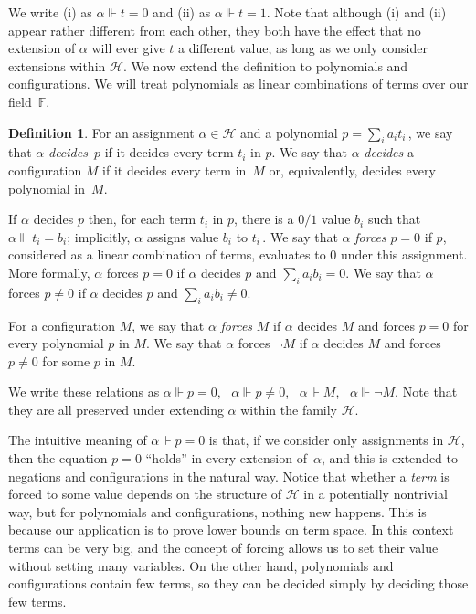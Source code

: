 \documentclass[11pt]{article}
\numberwithin{equation}{section}
\theoremstyle{definition}
\newtheorem{definition}[theorem]{Definition}
\theoremstyle{plain}
\newcommand\calH{\mathcal{H}}
\newcommand\bbF{\mathbb{F}}
\begin{document}
We write (i) as $\alpha \Vdash t=0$ and (ii) as $\alpha \Vdash t=1$.
Note that although (i) and  (ii) appear rather different from each other, they both have
the effect that no extension of $\alpha$ will ever give $t$ a different value,
as long as we only consider extensions within $\calH$.
We now extend the definition to polynomials and configurations.
We will treat polynomials as  linear combinations of terms over our field~$\bbF$.

\begin{definition}\label{def:forcing}
For an assignment $\alpha \in \calH$ and a polynomial $p=\sum_{i}a_i t_i$\,,
we say that $\alpha$ \emph{decides}~$p$ if it decides every term $t_i$ in $p$.
We say that $\alpha$ \emph{decides} a configuration $M$ if it decides every term in~$M$
or, equivalently, decides every polynomial in~$M$.

If $\alpha$ decides $p$ then, for each term $t_i$ in $p$, there is a $0/1$ value
$b_i$ such that $\alpha \Vdash t_i=b_i$; implicitly, $\alpha$ assigns value $b_i$ to $t_i$\,. 
We say that $\alpha$ \emph{forces} $p=0$ 
if $p$, considered as a linear combination of terms, evaluates to $0$ under this assignment.
More formally, $\alpha$ forces $p=0$ if $\alpha$ decides $p$ and $\sum_{i} a_ib_i =0$.
We say that $\alpha$ forces $p \neq 0$ if $\alpha$ decides $p$ and $\sum_{i} a_ib_i \neq 0$.

For a configuration $M$, we say that $\alpha$ \emph{forces} $M$ if $\alpha$ decides
$M$ and forces $p=0$ for every polynomial $p$ in $M$. We say that 
$\alpha$ forces $\neg M$ if $\alpha$ decides $M$ and forces $p \neq 0$ for some $p$ in $M$.
\end{definition}

We write these relations as $\alpha \Vdash p=0$, \ $\alpha \Vdash p \neq 0$, \
$\alpha \Vdash M$, \ $\alpha \Vdash \neg M$.
 Note that 
they are all preserved under extending $\alpha$ within the family $\calH$.

The intuitive meaning of $\alpha \Vdash p=0$ is that, if we consider only assignments in $\calH$,
then the equation $p=0$ ``holds'' in every extension of~$\alpha$, and this 
is extended to negations and configurations in the natural way.
Notice that whether a \emph{term} is forced to some value depends on the structure of $\calH$
in a potentially nontrivial way, but for polynomials and configurations, nothing new happens. 
This is because our application is to prove lower bounds on term space. 
In this context terms can be very big, and the concept of forcing allows us
to set their value without setting  many variables. On the other hand, 
polynomials and configurations contain few terms, so they can be decided simply by deciding those few terms.
\end{document}
